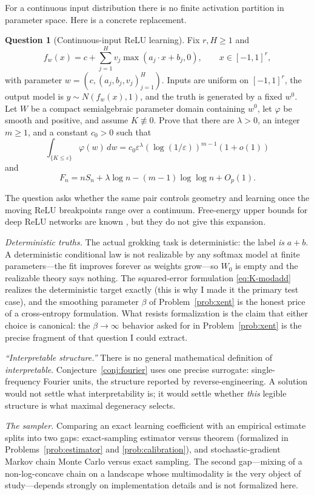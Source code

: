 \documentclass[11pt]{amsart}
\theoremstyle{plain}
\theoremstyle{definition}
\newtheorem{question}[theorem]{Question}
\begin{document}
For a continuous input distribution there is no finite activation partition in parameter space. Here is a concrete replacement.

\begin{question}[Continuous-input ReLU learning]\label{q:relu}
Fix $r,H\ge1$ and
\[
 f_w(x)=c+\sum_{j=1}^H v_j\max(a_j\cdot x+b_j,0),
 \qquad x\in[-1,1]^r,
\]
with parameter $w=(c,(a_j,b_j,v_j)_{j=1}^H)$. Inputs are uniform on $[-1,1]^r$, the output model is $y\sim N(f_w(x),1)$, and the truth is generated by a fixed $w^0$. Let $W$ be a compact semialgebraic parameter domain containing $w^0$, let $\varphi$ be smooth and positive, and assume $K\not\equiv0$. Prove that there are $\lambda>0$, an integer $m\ge1$, and a constant $c_0>0$ such that
\[
 \int_{\{K\le\varepsilon\}}\varphi(w)\,dw
 =c_0\varepsilon^\lambda(\log(1/\varepsilon))^{m-1}(1+o(1))
\]
and
\[
 F_n=nS_n+\lambda\log n-(m-1)\log\log n+O_p(1).
\]
\end{question}

The question asks whether the same pair controls geometry and learning once the moving ReLU breakpoints range over a continuum. Free-energy upper bounds for deep ReLU networks are known \cite{nagayasu2023}, but they do not give this expansion.

\emph{Deterministic truths.} The actual grokking task is deterministic: the label \emph{is} $a + b$. A deterministic conditional law is not realizable by any softmax model at finite parameters---the fit improves forever as weights grow---so $W_0$ is empty and the realizable theory says nothing. The squared-error formulation \eqref{eq:K-modadd} realizes the deterministic target exactly (this is why I made it the primary test case), and the smoothing parameter $\beta$ of Problem~\ref{prob:xent} is the honest price of a cross-entropy formulation. What resists formalization is the claim that either choice is canonical: the $\beta \to \infty$ behavior asked for in Problem~\ref{prob:xent} is the precise fragment of that question I could extract.

\emph{``Interpretable structure.''} There is no general mathematical definition of \emph{interpretable}. Conjecture~\ref{conj:fourier} uses one precise surrogate: single-frequency Fourier units, the structure reported by reverse-engineering. A solution would not settle what interpretability is; it would settle whether \emph{this} legible structure is what maximal degeneracy selects.

\emph{The sampler.} Comparing an exact learning coefficient with an empirical estimate splits into two gaps: exact-sampling estimator versus theorem (formalized in Problems~\ref{prob:estimator} and \ref{prob:calibration}), and stochastic-gradient Markov chain Monte Carlo versus exact sampling. The second gap---mixing of a non-log-concave chain on a landscape whose multimodality is the very object of study---depends strongly on implementation details and is not formalized here.
\end{document}
